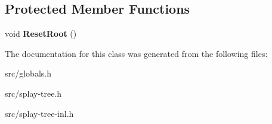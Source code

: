 \subsection*{Protected Member Functions}
\begin{DoxyCompactItemize}
\item 
\hypertarget{classv8_1_1internal_1_1_splay_tree_a2c43926f549f2cc564e6b66fe5fdd040}{}void {\bfseries Reset\+Root} ()\label{classv8_1_1internal_1_1_splay_tree_a2c43926f549f2cc564e6b66fe5fdd040}

\end{DoxyCompactItemize}


The documentation for this class was generated from the following files\+:\begin{DoxyCompactItemize}
\item 
src/globals.\+h\item 
src/splay-\/tree.\+h\item 
src/splay-\/tree-\/inl.\+h\end{DoxyCompactItemize}
